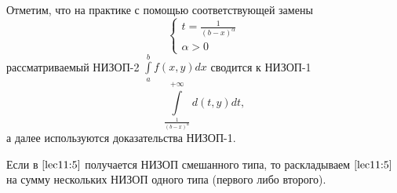 \documentclass[../../main.tex]{subfiles}
\begin{document}
	Отметим, что на практике с помощью соответствующей замены 
	\[\displaystyle 
	\left\{
		\begin{gathered}
			t = \frac{1}{(b - x)^\alpha} \\
			\alpha > 0
		\end{gathered}
	\right.
	\]
	рассматриваемый НИЗОП-2 $\int\limits_a^b f(x, y) dx$ сводится к НИЗОП-1 
	\begin{equation}\label{lec11:6}
		\int\limits_{\tfrac{1}{(b - x)^\alpha}}^{+\infty} d(t, y) dt,
	\end{equation}
	а далее используются доказательства НИЗОП-1.
	
	Если в $\eqref{lec11:5}$ получается НИЗОП смешанного типа, то раскладываем 
	$\eqref{lec11:5}$ на сумму нескольких НИЗОП одного типа (первого либо 
	второго).
\end{document}
